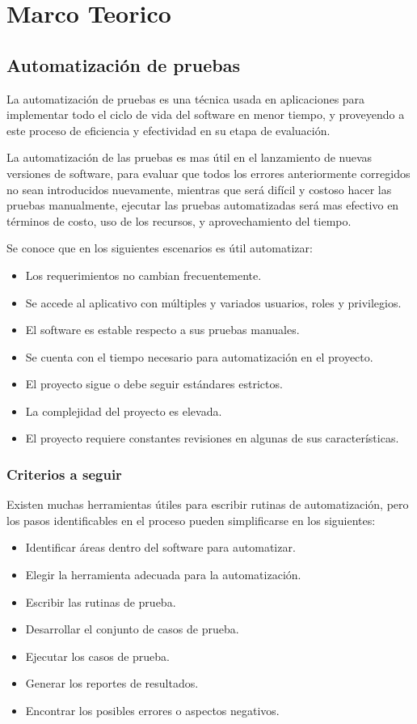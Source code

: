 \chapter{Marco Teorico}

\section{Automatización de pruebas}
La automatización de pruebas es una técnica usada en aplicaciones para
implementar todo el ciclo de vida del software en menor tiempo, y proveyendo a
este proceso de eficiencia y efectividad en su etapa de evaluación.

La automatización de las pruebas es mas útil en el lanzamiento de nuevas
versiones de software, para evaluar que todos los errores anteriormente
corregidos no sean introducidos nuevamente, mientras que será difícil y costoso
hacer las pruebas manualmente, ejecutar las pruebas automatizadas será mas
efectivo en términos de costo, uso de los recursos, y aprovechamiento del
tiempo.

Se conoce que en los siguientes escenarios es útil automatizar:

\begin{itemize}
    \item Los requerimientos no cambian frecuentemente.
    \item Se accede al aplicativo con múltiples y variados usuarios, roles y
        privilegios.
    \item El software es estable respecto a sus pruebas manuales.
    \item Se cuenta con el tiempo necesario para automatización en el proyecto.
    \item El proyecto sigue o debe seguir estándares estrictos.
    \item La complejidad del proyecto es elevada.
    \item El proyecto requiere constantes revisiones en algunas de sus
    características.
\end{itemize}

\subsection{Criterios a seguir}
Existen muchas herramientas útiles para escribir rutinas de automatización, pero
los pasos identificables en el proceso pueden simplificarse en los siguientes:

\begin{itemize}
    \item Identificar áreas dentro del software para automatizar.
    \item Elegir la herramienta adecuada para la automatización.
    \item Escribir las rutinas de prueba.
    \item Desarrollar el conjunto de casos de prueba.
    \item Ejecutar los casos de prueba.
    \item Generar los reportes de resultados.
    \item Encontrar los posibles errores o aspectos negativos.
\end{itemize}


